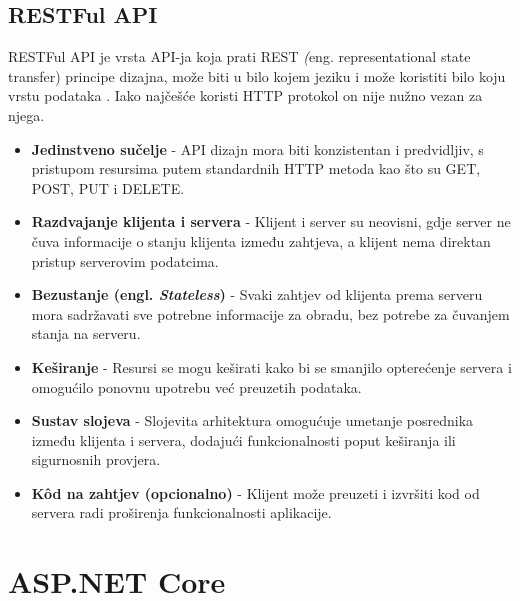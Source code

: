 \documentclass{foi}
\begin{document}
\section{RESTFul API}
RESTFul API je vrsta API-ja koja prati REST \textit(eng. {representational state transfer}) principe dizajna, može biti u bilo kojem jeziku i može koristiti bilo koju vrstu podataka \cite{ibm_rest_api}.
Iako najčešće koristi HTTP protokol on nije nužno vezan za njega.\cite{Microsoft2023}
\begin{itemize}
    \item \textbf{Jedinstveno sučelje} - API dizajn mora biti konzistentan i predvidljiv, s pristupom resursima putem standardnih HTTP metoda kao što su GET, POST, PUT i DELETE.
    
    \item \textbf{Razdvajanje klijenta i servera} - Klijent i server su neovisni, gdje server ne čuva informacije o stanju klijenta između zahtjeva, a klijent nema direktan pristup serverovim podatcima.
    
    \item \textbf{Bezustanje (engl. \textit{Stateless})} - Svaki zahtjev od klijenta prema serveru mora sadržavati sve potrebne informacije za obradu, bez potrebe za čuvanjem stanja na serveru.
    
    \item \textbf{Keširanje} - Resursi se mogu keširati kako bi se smanjilo opterećenje servera i omogućilo ponovnu upotrebu već preuzetih podataka.
    
    \item \textbf{Sustav slojeva} - Slojevita arhitektura omogućuje umetanje posrednika između klijenta i servera, dodajući funkcionalnosti poput keširanja ili sigurnosnih provjera.
    
    \item \textbf{Kôd na zahtjev (opcionalno)} - Klijent može preuzeti i izvršiti kod od servera radi proširenja funkcionalnosti aplikacije. 
\end{itemize}

\chapter{ASP.NET Core}
\end{document}
